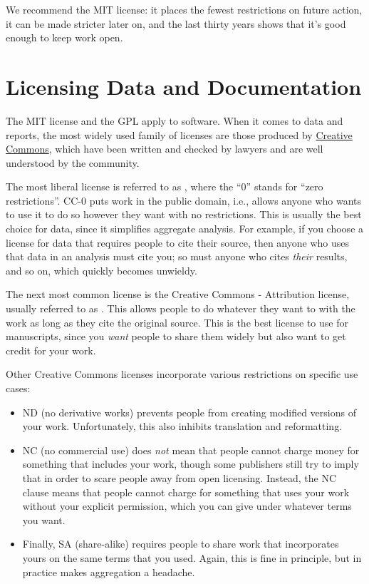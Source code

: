 We recommend the MIT license:
it places the fewest restrictions on future action,
it can be made stricter later on,
and the last thirty years shows that it's good enough to keep work open.

\section{Licensing Data and Documentation}\label{s:collab-datadocs}

The MIT license and the GPL apply to software.
When it comes to data and reports,
the most widely used family of licenses are those produced by \href{https://creativecommons.org/}{Creative Commons},
which have been written and checked by lawyers and are well understood by the community.

The most liberal license is referred to as ,
where the ``0'' stands for ``zero restrictions''.
CC-0 puts work in the public domain,
i.e.,
allows anyone who wants to use it to do so however they want with no restrictions.
This is usually the best choice for data,
since it simplifies aggregate analysis.
For example,
if you choose a license for data that requires people to cite their source,
then anyone who uses that data in an analysis must cite you;
so must anyone who cites \emph{their} results,
and so on,
which quickly becomes unwieldy.

The next most common license is the Creative Commons - Attribution license,
usually referred to as .
This allows people to do whatever they want to with the work
as long as they cite the original source.
This is the best license to use for manuscripts,
since you \emph{want} people to share them widely
but also want to get credit for your work.

Other Creative Commons licenses incorporate various restrictions on specific use cases:

\begin{itemize}
\item
  ND (no derivative works) prevents people from creating modified versions of your work.
  Unfortunately, this also inhibits translation and reformatting.
\item
  NC (no commercial use) does \emph{not} mean that people cannot charge money for something that includes your work,
  though some publishers still try to imply that in order to scare people away from open licensing.
  Instead,
  the NC clause means that people cannot charge for something that uses your work without your explicit permission,
  which you can give under whatever terms you want.
\item
  Finally,
  SA (share-alike) requires people to share work that incorporates yours
  on the same terms that you used.
  Again,
  this is fine in principle,
  but in practice makes aggregation a headache.
\end{itemize}

